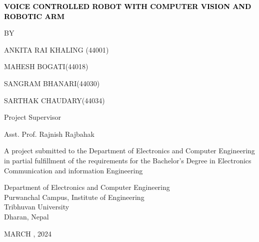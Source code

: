 \begin{titlepage}
    \centering
    
    {\fontsize{12pt}{14pt}\bfseries\textcolor{black}{VOICE CONTROLLED ROBOT WITH COMPUTER VISION AND ROBOTIC ARM}\par}
    \vspace{2.0cm}
       {BY}\par {ANKITA RAI KHALING} ({44001})
       \par {MAHESH BOGATI}({44018})
            \par {SANGRAM BHANARI}({44030})
            \par {SARTHAK CHAUDARY}({44034})
       \vspace{2.0cm}\par
    Project Supervisor\par
    Asst. Prof. Rajnish Rajbahak\par
    \vspace{2.0cm}
    {A project submitted to the Department of Electronics and Computer Engineering in partial fulfillment of the requirements for the Bachelor’s Degree in Electronics Communication and information Engineering}\par
        \vspace{2.0cm}\par

    {Department of Electronics and Computer Engineering\\ Purwanchal Campus, Institute of Engineering \\ Tribhuvan University\\ Dharan, Nepal}\par
        \vspace{1.2cm}\par
        
   {MARCH , 2024}
   
\end{titlepage}



